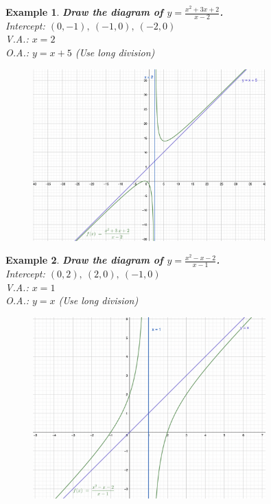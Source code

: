 \documentclass[12pt, a4paper]{article}
\newtheorem{example}{Example}[subsection]
\begin{document}
\begin{enumerate}
\begin{itemize}
\begin{example}
            \textbf{Draw the diagram of $\displaystyle y=\frac{x^2+3x+2}{x-2}$.}\\
            Intercept: $\displaystyle\left(0,-1\right),\ \left(-1,0\right),\ \left(-2,0\right)$\\
            V.A.: $x=2$\\
            O.A.: $y=x+5$ (Use long division)
            \begin{figure}[H]
                \centering
                \includegraphics[width=0.8\textwidth]{Fig.2.8.jpg}
            \end{figure}
        \end{example}
        \begin{example}
            \textbf{Draw the diagram of $\displaystyle y=\frac{x^2-x-2}{x-1}$.}\\
            Intercept: $\displaystyle\left(0,2\right),\ \left(2,0\right),\ \left(-1,0\right)$\\
            V.A.: $x=1$\\
            O.A.: $y=x$ (Use long division)
            \begin{figure}[H]
                \centering
                \includegraphics[width=0.8\textwidth]{Fig.2.9.jpg}

\end{figure}
\end{example}
\end{itemize}
\end{enumerate}
\end{document}
